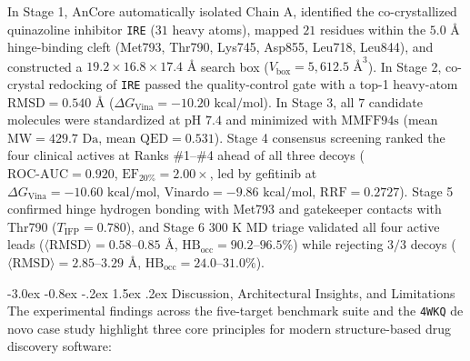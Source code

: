 \documentclass[11pt,a4paper]{article}
\makeatletter
\renewcommand{\section}{\@startsection{section}{1}{\z@}%
  {-3.0ex \@plus -0.8ex \@minus -.2ex}%
  {1.5ex \@plus.2ex}%
  {\normalfont\Large\bfseries\color{primary}}}
\makeatother
\begin{document}
In Stage 1, AnCore automatically isolated Chain A, identified the co-crystallized quinazoline inhibitor \texttt{IRE} ($31$ heavy atoms), mapped $21$ residues within the $5.0\text{ \AA}$ hinge-binding cleft (Met793, Thr790, Lys745, Asp855, Leu718, Leu844), and constructed a $19.2 \times 16.8 \times 17.4\text{ \AA}$ search box ($V_{\text{box}} = 5,612.5\text{ \AA}^3$). In Stage 2, co-crystal redocking of \texttt{IRE} passed the quality-control gate with a top-1 heavy-atom $\text{RMSD} = 0.540\text{ \AA}$ ($\Delta G_{\text{Vina}} = -10.20\text{ kcal/mol}$). In Stage 3, all $7$ candidate molecules were standardized at $\text{pH }7.4$ and minimized with $\text{MMFF94s}$ (mean $\text{MW} = 429.7\text{ Da}$, mean $\text{QED} = 0.531$). Stage 4 consensus screening ranked the four clinical actives at Ranks \#1--\#4 ahead of all three decoys ($\text{ROC-AUC} = 0.920$, $\text{EF}_{20\%} = 2.00\times$, led by gefitinib at $\Delta G_{\text{Vina}} = -10.60\text{ kcal/mol}$, $\text{Vinardo} = -9.86\text{ kcal/mol}$, $\text{RRF} = 0.2727$). Stage 5 confirmed hinge hydrogen bonding with Met793 and gatekeeper contacts with Thr790 ($T_{\text{IFP}} = 0.780$), and Stage 6 $300\text{ K}$ MD triage validated all four active leads ($\langle\text{RMSD}\rangle = 0.58\text{--}0.85\text{ \AA}$, $\text{HB}_{\text{occ}} = 90.2\text{--}96.5\%$) while rejecting $3/3$ decoys ($\langle\text{RMSD}\rangle = 2.85\text{--}3.29\text{ \AA}$, $\text{HB}_{\text{occ}} = 24.0\text{--}31.0\%$).

\section{Discussion, Architectural Insights, and Limitations}
\noindent The experimental findings across the five-target benchmark suite and the \texttt{4WKQ} de novo case study highlight three core principles for modern structure-based drug discovery software:
\end{document}
